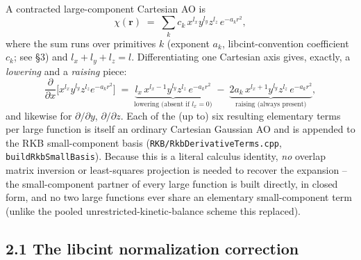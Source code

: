 \documentclass[11pt]{article}
\newcommand{\bs}[1]{\boldsymbol{#1}}
\begin{document}
A contracted large-component Cartesian AO is
\begin{equation}
\chi(\bs r) \;=\; \sum_k c_k\, x^{l_x} y^{l_y} z^{l_z}\, e^{-a_k r^2},
\end{equation}
where the sum runs over primitives $k$ (exponent $a_k$, libcint-convention coefficient $c_k$; see
\S3) and $l_x+l_y+l_z=l$. Differentiating one Cartesian axis gives, exactly, a \emph{lowering} and
a \emph{raising} piece:
\begin{equation}
\frac{\partial}{\partial x}\Big[x^{l_x} y^{l_y} z^{l_z} e^{-a_k r^2}\Big]
\;=\;
\underbrace{l_x\, x^{l_x-1} y^{l_y} z^{l_z}\, e^{-a_k r^2}}_{\text{lowering (absent if } l_x=0)}
\;-\;
\underbrace{2 a_k\, x^{l_x+1} y^{l_y} z^{l_z}\, e^{-a_k r^2}}_{\text{raising (always present)}},
\end{equation}
and likewise for $\partial/\partial y$, $\partial/\partial z$. Each of the (up to) six resulting
elementary terms per large function is itself an ordinary Cartesian Gaussian AO and is appended to
the RKB small-component basis (\texttt{RKB/RkbDerivativeTerms.cpp}, \texttt{buildRkbSmallBasis}).
Because this is a literal calculus identity, \emph{no} overlap matrix inversion or least-squares
projection is needed to recover the expansion -- the small-component partner of every large
function is built directly, in closed form, and no two large functions ever share an elementary
small-component term (unlike the pooled unrestricted-kinetic-balance scheme this replaced).

\subsection*{2.1 The libcint normalization correction}
\end{document}
